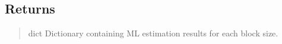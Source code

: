 \documentclass[a4paper,11pt,openany,english]{sphinxmanual}
\begin{document}
\begin{fulllineitems}
\subsection{Returns}
\label{\detokenize{api_topt:id93}}\begin{quote}\begin{description}
\sphinxAtStartPar
dict
Dictionary containing ML estimation results for each block size.

\end{description}\end{quote}

\end{fulllineitems}

\end{document}
